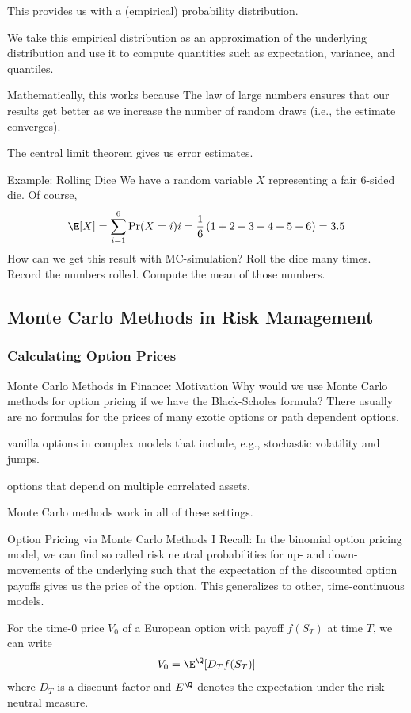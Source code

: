 		This provides us with a (empirical) probability distribution.
		
		We take this empirical distribution as an approximation of the
		underlying distribution and use it to compute quantities such as
		expectation, variance, and quantiles.
		
	Mathematically, this works because
		The law of large numbers ensures that our results get better as we
  	increase the number of random draws (i.e., the estimate converges).
		
		The central limit theorem gives us error estimates.



Example: Rolling Dice
	We have a random variable $X$ representing a fair 6-sided die. Of course,
		\begin{align*}
			\E[X] = \sum_{i=1}^6 \Pr(X=i)i=\frac{1}{6}\left( 1 + 2 + 3 + 4 + 5 + 6
			\right)= 3.5
		\end{align*}
	How can we get this result with MC-simulation?
		Roll the dice many times.
		Record the numbers rolled.
		Compute the mean of those numbers.


\subsection{Monte Carlo Methods in Risk Management}
\subsubsection{Calculating Option Prices}

Monte Carlo Methods in Finance: Motivation
	Why would we use Monte Carlo methods for option pricing if we have the
	Black-Scholes formula? There usually are no formulas for the prices of
		many exotic options or path dependent options.
		
		vanilla options in complex models that include, e.g., stochastic
		volatility and jumps.
		
		options that depend on multiple correlated assets.

	Monte Carlo methods work in all of these settings.


Option Pricing via Monte Carlo Methods I
	Recall: In the binomial option pricing model, we can find so
	called risk neutral probabilities for up- and down-movements of the underlying
	such that the  expectation of the discounted option payoffs gives us the price
	of the option. This generalizes to other, time-continuous models.

	For the time-$0$ price $V_0$ of a European option with payoff $f(S_T)$ at time
	$T$, we can write
		\begin{align*}
			V_0 = \E^\mathbb{\Q}[D_T f(S_T)]
		\end{align*}
	where $D_T$ is a discount factor and $E^\mathbb{\Q}$ denotes the expectation
	under the risk-neutral measure.



